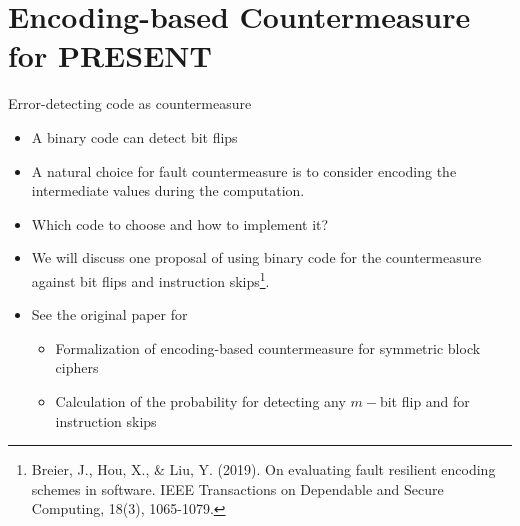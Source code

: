 \section{Encoding-based Countermeasure for PRESENT}
\begin{frame}{\VideoName}
    \tableofcontents[currentsection]
\end{frame}

\begin{frame}{Error-detecting code as countermeasure}
    \begin{itemize}
        \item A binary code can detect bit flips
        \item A natural choice for fault countermeasure is to consider encoding the intermediate values during the computation.
        \item Which code to choose and how to implement it?
        \item We will discuss one proposal of using binary code for the countermeasure against bit flips and instruction skips\footnote{Breier, J., Hou, X., \& Liu, Y. (2019). On evaluating fault resilient encoding schemes in software. IEEE Transactions on Dependable and Secure Computing, 18(3), 1065-1079.}.
        \item See the original paper for
        \begin{itemize}
            \item Formalization of encoding-based countermeasure for symmetric block ciphers
           \item Calculation of the probability for detecting any $m-$bit flip and for instruction skips
        \end{itemize}
    \end{itemize}
\end{frame}


